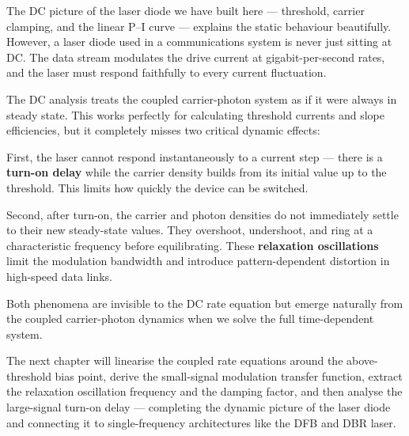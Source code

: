The DC picture of the laser diode we have built here — threshold, carrier clamping, and the linear P--I curve — explains the static behaviour beautifully. However, a laser diode used in a communications system is never just sitting at DC. The data stream modulates the drive current at gigabit-per-second rates, and the laser must respond faithfully to every current fluctuation.

\begin{keyinsight}
    The DC analysis treats the coupled carrier-photon system as if it were always in steady state. This works perfectly for calculating threshold currents and slope efficiencies, but it completely misses two critical dynamic effects:

    First, the laser cannot respond instantaneously to a current step — there is a \textbf{turn-on delay} while the carrier density builds from its initial value up to the threshold. This limits how quickly the device can be switched.

    Second, after turn-on, the carrier and photon densities do not immediately settle to their new steady-state values. They overshoot, undershoot, and ring at a characteristic frequency before equilibrating. These \textbf{relaxation oscillations} limit the modulation bandwidth and introduce pattern-dependent distortion in high-speed data links.

    Both phenomena are invisible to the DC rate equation but emerge naturally from the coupled carrier-photon dynamics when we solve the full time-dependent system.
\end{keyinsight}

The next chapter will linearise the coupled rate equations around the above-threshold bias point, derive the small-signal modulation transfer function, extract the relaxation oscillation frequency and the damping factor, and then analyse the large-signal turn-on delay — completing the dynamic picture of the laser diode and connecting it to single-frequency architectures like the DFB and DBR laser.
